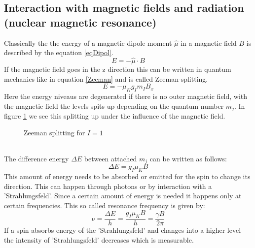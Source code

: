\subsection{Interaction with magnetic fields and radiation (nuclear magnetic resonance)}
Classically the the energy of a magnetic dipole moment $\hat{\mu}$ in a magnetic field $B$ is described by the equation \ref{eqDipol}.
\begin{equation}
E=-\hat{\mu}\cdot B
\label{eqDipol}
\end{equation}
If the magnetic field goes in the z direction this can be written in quantum mechanics like in equation \ref{Zeeman} and is called Zeeman-splitting. 
\begin{equation}
E = - \mu_K g_I m_I B_x
\label{Zeeman}
\end{equation}
Here the energy niveaus are degenerated if there is no outer magnetic field, with the magnetic field the levels spits up depending on the quantum number $m_j$. In figure \ref{ZeemanBild} we see this splitting up under the influence of the magnetic field. 
\begin{figure}[h]
	\centering
	\caption[Zeeman Splitting]{Zeeman splitting for $I=1$}
	\label{ZeemanBild}
\end{figure}\\
The difference energy $\Delta E$ between attached $m_j$ can be written as follows:
\begin{equation}
\Delta E = g_I \mu_K B
\end{equation}   
This amount of energy needs to be absorbed or emitted for the spin to change its direction. This can happen through photons or by interaction with a 'Strahlungsfeld'. Since a certain amount of energy is needed it happens only at certain frequencies. This so called resonance frequency is given by:
\begin{equation}
	\nu = \frac{\Delta E}{h}=\frac{g_I\mu_KB}{h}=\frac{\gamma B}{2\pi}	
	\label{important_formular}
\end{equation}
If a spin absorbs energy of the 'Strahlungsfeld' and changes into a higher level the intensity of 'Strahlungsfeld' decreases which is measurable. 
